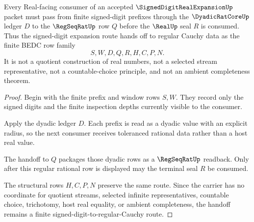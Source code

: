 \begin{theorem}
\label{thm:signed-digit-real-expansion-regseqrat-handoff}
Every Real-facing consumer of an accepted $\SignedDigitRealExpansionUp$ packet must pass from finite signed-digit prefixes through the $\DyadicRatCoreUp$ ledger $D$ to the $\RegSeqRatUp$ row $Q$ before the $\RealUp$ seal $R$ is consumed. Thus the signed-digit expansion route hands off to regular Cauchy data as the finite BEDC row family
$$
S,W,D,Q,R,H,C,P,N .
$$
It is not a quotient construction of real numbers, not a selected stream representative, not a countable-choice principle, and not an ambient completeness theorem.
\end{theorem}
\begin{proof}
Begin with the finite prefix and window rows $S,W$. They record only the signed digits and the finite inspection depths currently visible to the consumer.

Apply the dyadic ledger $D$. Each prefix is read as a dyadic value with an explicit radius, so the next consumer receives toleranced rational data rather than a host real value.

The handoff to $Q$ packages those dyadic rows as a $\RegSeqRatUp$ readback. Only after this regular rational row is displayed may the terminal seal $R$ be consumed.

The structural rows $H,C,P,N$ preserve the same route. Since the carrier has no coordinate for quotient streams, selected infinite representatives, countable choice, trichotomy, host real equality, or ambient completeness, the handoff remains a finite signed-digit-to-regular-Cauchy route.
\end{proof}


\begin{closurestatus}{\SignedDigitRealExpansionUp}
  \theoryclosure{\seedClosure}
  \formalstatus{\unformalizedV}
\end{closurestatus}
